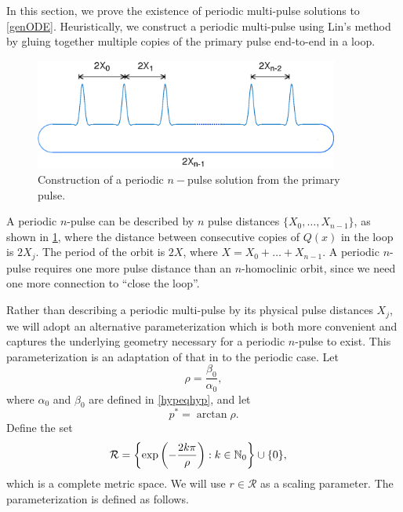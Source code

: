 \documentclass[11pt,reqno]{amsart}
\theoremstyle{plain}
\theoremstyle{definition}
\theoremstyle{remark}
\begin{document}
In this section, we prove the existence of periodic multi-pulse solutions to \cref{genODE}. Heuristically, we construct a periodic multi-pulse using Lin's method by gluing together multiple copies of the primary pulse end-to-end in a loop.
\begin{figure}[H]
\begin{center}
\includegraphics[width=10cm]{images/multipulseperiodic}
\end{center}
\caption[Construction of a periodic $n-$pulse solution]{Construction of a periodic $n-$pulse solution from the primary pulse.}
\label{fig:permultipulse}
\end{figure}
A periodic $n$-pulse can be described by $n$ pulse distances $\{X_0, \dots, X_{n-1} \}$, as shown in \cref{fig:permultipulse}, where the distance between consecutive copies of $Q(x)$ in the loop is $2 X_j$. The period of the orbit is $2X$, where $X = X_0 + \dots + X_{n-1}$. A periodic $n$-pulse requires one more pulse distance than an $n$-homoclinic orbit, since we need one more connection to ``close the loop''.  

Rather than describing a periodic multi-pulse by its physical pulse distances $X_j$, we will adopt an alternative parameterization which is both more convenient and captures the underlying geometry necessary for a periodic $n$-pulse to exist. This parameterization is an adaptation of that in \cite{SandstedeStrut,Sandstede1998} to the periodic case. Let
\begin{equation}\label{defrho}
\rho = \frac{\beta_0}{\alpha_0},
\end{equation}
where $\alpha_0$ and $\beta_0$ are defined in \cref{hypeqhyp}, and let
\begin{equation}\label{pstar}
p^* = \arctan \rho.
\end{equation}
Define the set
\begin{align}
\mathcal{R} &= \left\{ \mathop\mathrm{exp}\nolimits\left(-\frac{2 k \pi}{\rho}\right) : k \in \mathbb{N}_0 \right\} \cup \{ 0 \},
\end{align}
which is a complete metric space. We will use $r \in \mathcal{R}$ as a scaling parameter. The parameterization is defined as follows.
\end{document}
